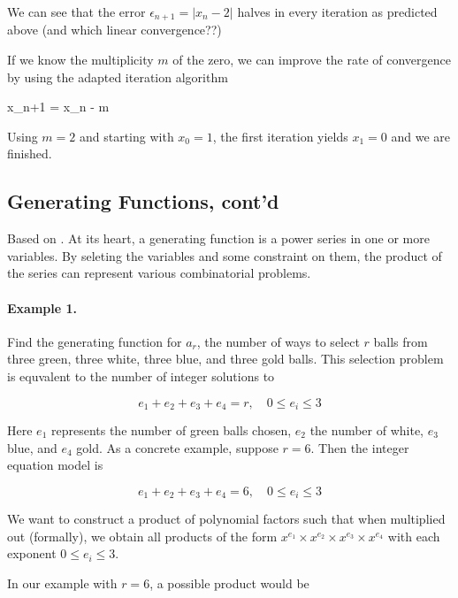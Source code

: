 \vspace*{3mm}

We can see that the error $\epsilon_{n+1} = |x_n - 2|$ halves in every iteration as predicted above (and which linear convergence??)

If we know the multiplicity $m$ of the zero, we can improve the rate of convergence by using the adapted iteration algorithm

\bee
x_{n+1} = x_n - m 
\eee

Using $m=2$ and starting with $x_0=1$, the first iteration yields $x_1 = 0$ and we are finished.


\subsection{Generating Functions, cont'd}

Based on \cite{Tucker}.  At its heart, a generating function is a power series in one or more variables. By seleting the variables and some constraint on them, the product of the series can represent various combinatorial problems.

\paragraph{Example 1.} Find the generating function for $a_r$, the number of ways to select $r$ balls from three green, three white, three blue, and three gold balls. This selection problem is equvalent to the number of integer solutions to

\begin{equation*}
  e_1 + e_2 + e_3 + e_4 = r, \quad 0 \leq e_i \leq 3
\end{equation*}

Here $e_1$ represents the number of green balls chosen, $e_2$ the number of white, $e_3$ blue, and $e_4$ gold. As a concrete example, suppose $r = 6$. Then the integer equation model is

\begin{equation*}
  e_1 + e_2 + e_3 + e_4 = 6, \quad 0 \leq e_i \leq 3
\end{equation*}

We want to construct a product of polynomial factors such that when multiplied out (formally), we obtain all products of the form $x^{e_1} \times x^{e_2} \times x^{e_3} \times x^{e_4}$ with each exponent $0 \leq e_i \leq 3$.

In our example with $r=6$, a possible product would be

